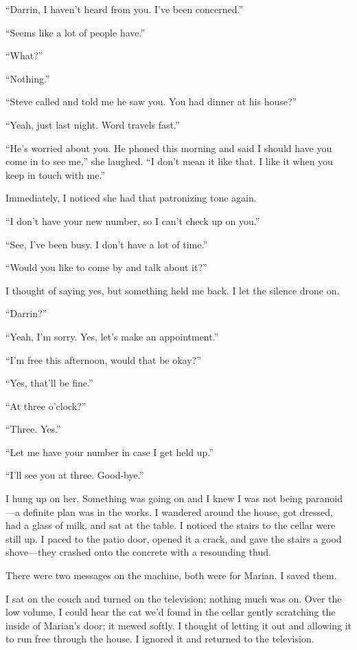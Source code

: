 \documentclass[
]{article}
\begin{document}
``Darrin, I haven't heard from you. I've been concerned.''

``Seems like a lot of people have.''

``What?''

``Nothing.''

``Steve called and told me he saw you. You had dinner at his house?''

``Yeah, just last night. Word travels fast.''

``He's worried about you. He phoned this morning and said I should have
you come in to see me,'' she laughed. ``I don't mean it like that. I
like it when you keep in touch with me.''

Immediately, I noticed she had that patronizing tone again.

``I don't have your new number, so I can't check up on you.''

``See, I've been busy. I don't have a lot of time.''

``Would you like to come by and talk about it?''

I thought of saying yes, but something held me back. I let the silence
drone on.

``Darrin?''

``Yeah, I'm sorry. Yes, let's make an appointment.''

``I'm free this afternoon, would that be okay?''

``Yes, that'll be fine.''

``At three o'clock?''

``Three. Yes.''

``Let me have your number in case I get held up.''

``I'll see you at three. Good-bye.''

I hung up on her. Something was going on and I knew I was not being
paranoid---a definite plan was in the works. I wandered around the
house, got dressed, had a glass of milk, and sat at the table. I noticed
the stairs to the cellar were still up. I paced to the patio door,
opened it a crack, and gave the stairs a good shove---they crashed onto
the concrete with a resounding thud.

There were two messages on the machine, both were for Marian. I saved
them.

I sat on the couch and turned on the television; nothing much was on.
Over the low volume, I could hear the cat we'd found in the cellar
gently scratching the inside of Marian's door; it mewed softly. I
thought of letting it out and allowing it to run free through the house.
I ignored it and returned to the television.
\end{document}
